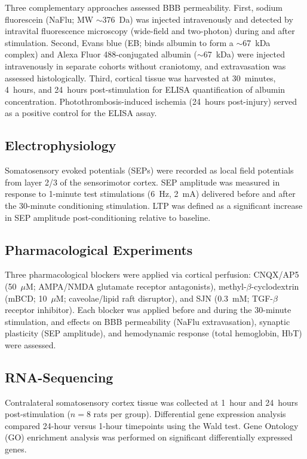 \documentclass[11pt]{article}
\begin{document}
Three complementary approaches assessed BBB permeability. First, sodium fluorescein (NaFlu; MW $\sim$376~Da) was injected intravenously and detected by intravital fluorescence microscopy (wide-field and two-photon) during and after stimulation. Second, Evans blue (EB; binds albumin to form a $\sim$67~kDa complex) and Alexa Fluor 488-conjugated albumin ($\sim$67~kDa) were injected intravenously in separate cohorts without craniotomy, and extravasation was assessed histologically. Third, cortical tissue was harvested at 30~minutes, 4~hours, and 24~hours post-stimulation for ELISA quantification of albumin concentration. Photothrombosis-induced ischemia (24~hours post-injury) served as a positive control for the ELISA assay.

\subsection{Electrophysiology}

Somatosensory evoked potentials (SEPs) were recorded as local field potentials from layer 2/3 of the sensorimotor cortex. SEP amplitude was measured in response to 1-minute test stimulations (6~Hz, 2~mA) delivered before and after the 30-minute conditioning stimulation. LTP was defined as a significant increase in SEP amplitude post-conditioning relative to baseline.

\subsection{Pharmacological Experiments}

Three pharmacological blockers were applied via cortical perfusion: CNQX/AP5 (50~$\mu$M; AMPA/NMDA glutamate receptor antagonists), methyl-$\beta$-cyclodextrin (mBCD; 10~$\mu$M; caveolae/lipid raft disruptor), and SJN (0.3~mM; TGF-$\beta$ receptor inhibitor). Each blocker was applied before and during the 30-minute stimulation, and effects on BBB permeability (NaFlu extravasation), synaptic plasticity (SEP amplitude), and hemodynamic response (total hemoglobin, HbT) were assessed.

\subsection{RNA-Sequencing}

Contralateral somatosensory cortex tissue was collected at 1~hour and 24~hours post-stimulation ($n = 8$ rats per group). Differential gene expression analysis compared 24-hour versus 1-hour timepoints using the Wald test. Gene Ontology (GO) enrichment analysis was performed on significant differentially expressed genes.
\end{document}
